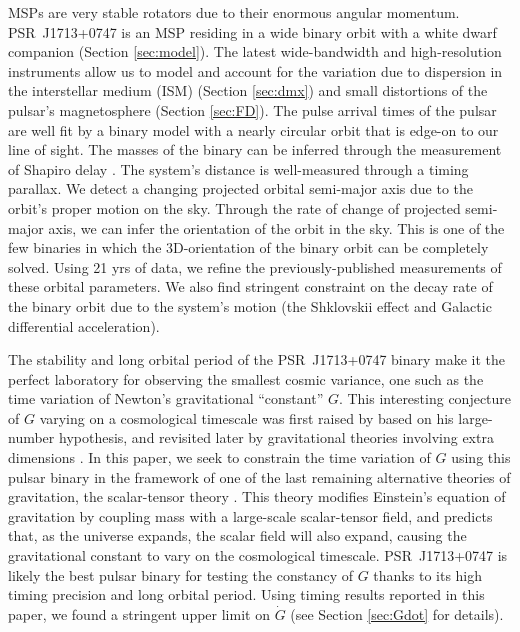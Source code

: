 MSPs are very stable rotators due to their enormous
angular momentum. PSR~J1713+0747 is an MSP residing in a wide binary orbit with a white dwarf companion (Section \ref{sec:model}). 
The latest wide-bandwidth and high-resolution instruments allow us to model
and account for the variation due to dispersion in the interstellar medium (ISM)
(Section \ref{sec:dmx}) and small distortions of the pulsar's magnetosphere (Section \ref{sec:FD}). 
The pulse arrival times of the pulsar are well fit by a binary model with
a nearly circular orbit that is edge-on to our line of sight. The masses of
the binary can be inferred through the measurement of Shapiro delay \citep{sns+05}. 
The system's distance is well-measured through a timing parallax. We detect
a changing projected orbital semi-major axis due to the orbit's proper motion
on the sky. Through the rate of change of projected semi-major axis, we can infer 
the orientation of the orbit in the sky.
This is one of the few binaries in which the 3D-orientation of the
binary orbit can be completely solved. Using 21 yrs of data, we
refine the previously-published measurements of these orbital parameters.
We also find stringent constraint on the decay rate of the binary orbit due to the system's
motion (the Shklovskii effect and Galactic differential acceleration).

The stability and long orbital period of the PSR~J1713+0747 binary make it the
perfect laboratory for observing the smallest cosmic variance, 
one such as the time variation of Newton's gravitational ``constant'' $G$. 
This interesting conjecture of $G$ varying on a cosmological timescale was first 
raised by \citet{dir37} based on his large-number hypothesis, and 
revisited later by gravitational theories involving extra dimensions
\citep{mar84,ww86a}.
In this paper, we seek to constrain the time variation of $G$ using this pulsar
binary in the framework of one of the last remaining alternative theories of gravitation, the scalar-tensor theory \citep{jor59,fie56,bd61}. 
This theory modifies Einstein's equation of gravitation by coupling mass with
a large-scale scalar-tensor field, and predicts that, as the universe expands,
the scalar field will also expand, causing the gravitational constant to vary  
on the cosmological timescale. 
PSR~J1713+0747 is likely the best pulsar binary for testing the constancy of
$G$ thanks to its high timing precision and long orbital period. Using timing
results reported in this paper, we found a stringent upper limit on 
$\dot{G}$ (see Section \ref{sec:Gdot} for details). 

